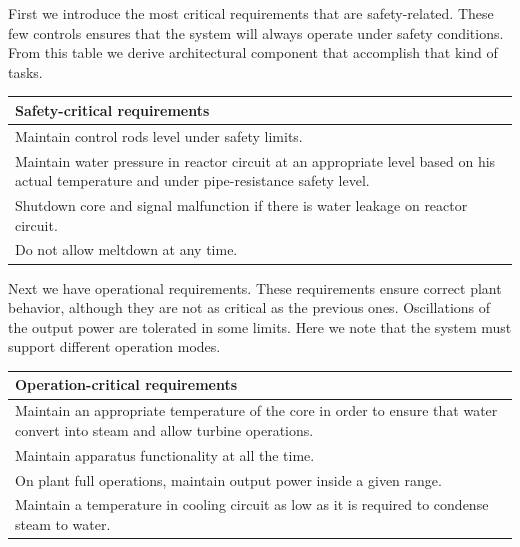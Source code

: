 \documentclass[10pt,a4paper]{report}
\begin{document}
First we introduce the most critical requirements that are safety-related. These
few controls ensures that the system will always operate under safety conditions.
From this table we derive architectural component that accomplish that kind of 
tasks.
\begin{center} 
\begin{tabular}{| p{10cm} |}
\hline
\textbf{Safety-critical requirements}\\
\hline \hline
Maintain control rods level under safety limits.\\
\hline
Maintain water pressure in reactor circuit at an appropriate level based on 
his actual temperature and under pipe-resistance safety level.\\  
\hline
Shutdown core and signal malfunction if there is water leakage on reactor circuit.\\ 
\hline 
Do not allow meltdown at any time.\\
\hline
\end{tabular}
\end{center}

Next we have operational requirements. These requirements ensure correct plant 
behavior, although they are not as critical as the previous ones. Oscillations of 
the output power are tolerated in some limits. Here we note that the system must
support different operation modes. 
\begin{center}
\begin{tabular}{| p{10cm} |}
\hline
\textbf{Operation-critical requirements}\\
\hline \hline
Maintain an appropriate temperature of the core in order to ensure that water 
convert into steam and allow turbine operations.\\
\hline
Maintain apparatus functionality at all the time. \\ 
\hline
On plant full operations, maintain output power inside a given range.\\
\hline
Maintain a temperature in cooling circuit as low as it is required to condense 
steam to water. \\
\hline
\end{tabular}
\end{center}
\end{document}
